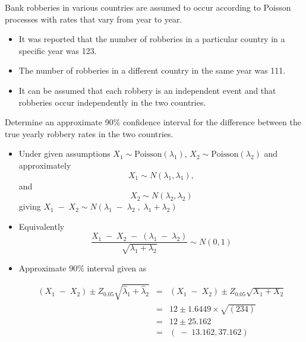 \documentclass[a4paper,12pt]{article}
\begin{document}
\large
\noindent Bank robberies in various countries are assumed to occur according to Poisson
processes with rates that vary from year to year.
\begin{itemize}
    \item It was reported that the number of robberies in a particular country in a specific year was 123. 
    \item The number of robberies
in a different country in the same year was 111. 
\item It can be assumed that each robbery is an independent event and that robberies occur independently in the two countries.
\end{itemize}
Determine an approximate 90\% confidence interval for the difference between the true yearly robbery rates in the two countries.

\newpage

\begin{itemize}
\item Under given assumptions $X_1 \sim \mbox{Poisson}(\lambda_1 )$, $X_2 \sim \mbox{Poisson}(\lambda_2 )$ and approximately
\[X_1 \sim  N(\lambda_1 , \lambda_1 ),\] and \[ X_{2} \sim  N(\lambda_2 , \lambda_2 )\]
giving $X_1 \;-\; X_2 \sim  N(\lambda_1 \;-\; \lambda_2 \;,\; \lambda_1 + \lambda_2 )$
\item Equivalently
\[
\frac{X_{1} \;-\; X_{2} \;-\; ( \lambda_1 \;-\; \lambda_2 )}{\sqrt{\lambda_1 + \lambda_2 }}
\sim N (0,1)
\]
\item Approximate 90\% interval given as

\begin{eqnarray*}
(X_{1} \;-\; X_{2}) \pm Z_{0.05} \sqrt{\hat{\lambda}_1 + \hat{\lambda}_2 } &=& (X_{1} \;-\; X_{2}) \pm Z_{0.05} \sqrt{X_{1} + X_{2}}\\
&=& 12 \pm 1.6449 \times \sqrt{(234)} \\ &=& 12 \pm 25.162 \\ &=&  (\;-\;13.162, 37.162)\\
\end{eqnarray*}

\end{itemize}
\end{document}
